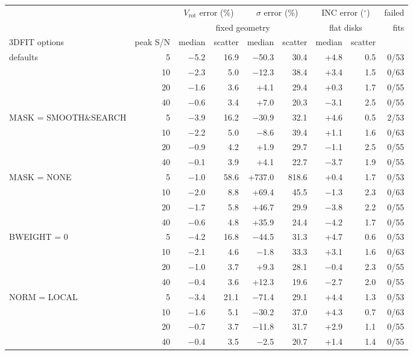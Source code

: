 \begin{tabular}{l r rr rr rr r}
\toprule
 & & \multicolumn{2}{c}{$V_\mathrm{rot}$ error (\%)} & \multicolumn{2}{c}{$\sigma$ error (\%)} & \multicolumn{2}{c}{INC error ($^\circ$)} & failed \\
 & & \multicolumn{4}{c}{fixed geometry} & \multicolumn{2}{c}{flat disks} & fits \\
\cmidrule(lr){3-6}\cmidrule(lr){7-8}
3DFIT options & peak S/N & median & scatter & median & scatter & median & scatter & \\
\midrule
defaults & 5 & $-$5.2 & 16.9 & $-$50.3 & 30.4 & +4.8 & 0.5 & 0/53 \\
 & 10 & $-$2.3 & 5.0 & $-$12.3 & 38.4 & +3.4 & 1.5 & 0/63 \\
 & 20 & $-$1.6 & 3.6 & +4.1 & 29.4 & +0.3 & 1.7 & 0/55 \\
 & 40 & $-$0.6 & 3.4 & +7.0 & 20.3 & $-$3.1 & 2.5 & 0/55 \\
\addlinespace
MASK = SMOOTH\&SEARCH & 5 & $-$3.9 & 16.2 & $-$30.9 & 32.1 & +4.6 & 0.5 & 2/53 \\
 & 10 & $-$2.2 & 5.0 & $-$8.6 & 39.4 & +1.1 & 1.6 & 0/63 \\
 & 20 & $-$0.9 & 4.2 & +1.9 & 29.7 & $-$1.1 & 2.5 & 0/55 \\
 & 40 & $-$0.1 & 3.9 & +4.1 & 22.7 & $-$3.7 & 1.9 & 0/55 \\
\addlinespace
MASK = NONE & 5 & $-$1.0 & 58.6 & +737.0 & 818.6 & +0.4 & 1.7 & 0/53 \\
 & 10 & $-$2.0 & 8.8 & +69.4 & 45.5 & $-$1.3 & 2.3 & 0/63 \\
 & 20 & $-$1.7 & 5.8 & +46.7 & 29.9 & $-$3.8 & 2.2 & 0/55 \\
 & 40 & $-$0.6 & 4.8 & +35.9 & 24.4 & $-$4.2 & 1.7 & 0/55 \\
\addlinespace
BWEIGHT = 0 & 5 & $-$4.2 & 16.8 & $-$44.5 & 31.3 & +4.7 & 0.6 & 0/53 \\
 & 10 & $-$2.1 & 4.6 & $-$1.8 & 33.3 & +3.1 & 1.6 & 0/63 \\
 & 20 & $-$1.0 & 3.7 & +9.3 & 28.1 & $-$0.4 & 2.3 & 0/55 \\
 & 40 & $-$0.4 & 3.6 & +12.3 & 19.6 & $-$2.7 & 2.0 & 0/55 \\
\addlinespace
NORM = LOCAL & 5 & $-$3.4 & 21.1 & $-$71.4 & 29.1 & +4.4 & 1.3 & 0/53 \\
 & 10 & $-$1.6 & 5.1 & $-$30.2 & 37.0 & +4.3 & 0.7 & 0/63 \\
 & 20 & $-$0.7 & 3.7 & $-$11.8 & 31.7 & +2.9 & 1.1 & 0/55 \\
 & 40 & $-$0.4 & 3.5 & $-$2.5 & 20.7 & +1.4 & 1.4 & 0/55 \\
\bottomrule
\end{tabular}
